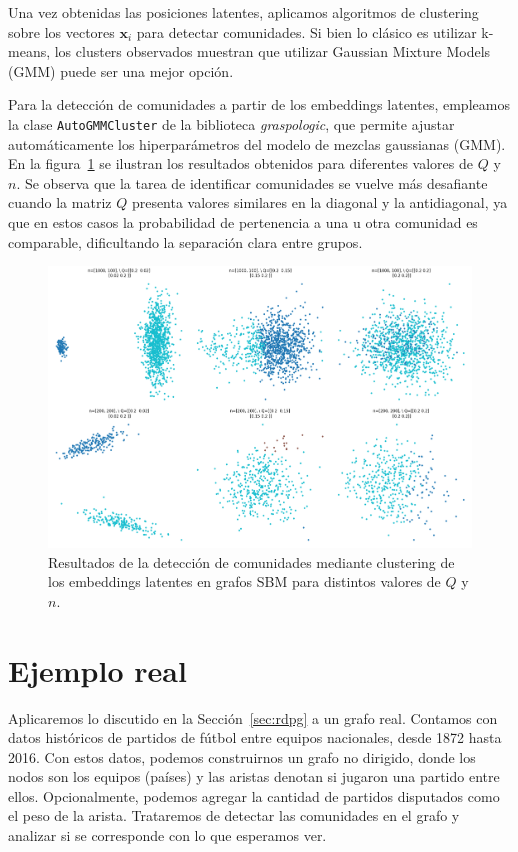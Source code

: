 \documentclass{article}
\begin{document}
Una vez obtenidas las posiciones latentes, aplicamos algoritmos de clustering sobre los vectores $\mathbf{x}_i$ para detectar comunidades. Si bien lo clásico es utilizar k-means, los clusters observados muestran que utilizar Gaussian Mixture Models (GMM) puede ser una mejor opción.

Para la detección de comunidades a partir de los embeddings latentes, empleamos la clase \verb|AutoGMMCluster| de la biblioteca \textit{graspologic}, que permite ajustar automáticamente los hiperparámetros del modelo de mezclas gaussianas (GMM). En la figura~\ref{fig:comunidades} se ilustran los resultados obtenidos para diferentes valores de $Q$ y $n$. Se observa que la tarea de identificar comunidades se vuelve más desafiante cuando la matriz $Q$ presenta valores similares en la diagonal y la antidiagonal, ya que en estos casos la probabilidad de pertenencia a una u otra comunidad es comparable, dificultando la separación clara entre grupos.

\begin{figure}[htb]
    \centering
    \includegraphics[width=0.7\linewidth]{images/comunidades.png}
    \caption{ Resultados de la detección de comunidades mediante clustering de los embeddings latentes en grafos SBM para distintos valores de $Q$ y $n$.}
    \label{fig:comunidades}
\end{figure}


\section{Ejemplo real}
\label{sec:ejemplo_real}

Aplicaremos lo discutido en la Sección~\ref{sec:rdpg} a un grafo real. Contamos con datos históricos de partidos de fútbol entre equipos nacionales, desde 1872
hasta 2016. Con estos datos, podemos construirnos un grafo no dirigido, donde los nodos son los equipos (países) y las aristas denotan si jugaron una partido entre ellos.
Opcionalmente, podemos agregar la cantidad de partidos disputados como el peso de la arista. Trataremos de detectar las comunidades en el grafo y analizar si se corresponde con lo que esperamos ver.
\end{document}
